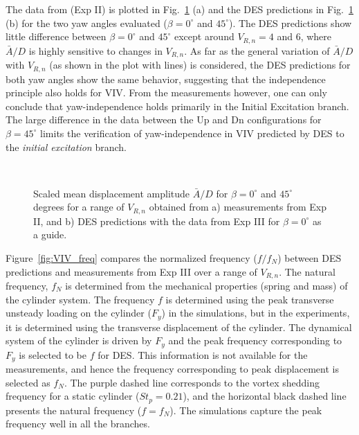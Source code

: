 The data from \citet{franzini2013one} (Exp II) is plotted in
Fig.~\ref{fig:VIV_yaw} (a) and the DES predictions in Fig.~\ref{fig:VIV_yaw}
(b) for the two yaw angles evaluated ($\beta=0^\circ$ and $45^\circ$). The DES
predictions show little difference between $\beta=0^\circ$ and $45^\circ$
except around $V_{R,n}=4$ and $6$, where $\bar{A}/D$ is highly sensitive to
changes in $V_{R,n}$. As far as the general variation of $\bar{A}/D$ with
$V_{R,n}$ (as shown in the plot with lines) is considered, the DES predictions
for both yaw angles show the same behavior, suggesting that the independence
principle also holds for VIV. From the measurements however, one can only
conclude that yaw-independence holds primarily in the Initial Excitation
branch. The large difference in the data between the Up and Dn configurations
for $\beta=45^\circ$ limits the verification of yaw-independence in VIV
predicted by DES to the {\em initial excitation} branch.
%
\begin{figure}[htb!]
  \qquad
     {} \\
  \caption{Scaled mean displacement amplitude $\bar{A}/D$ for $\beta=0^\circ$
    and $45^\circ$ degrees for a range of $V_{R,n}$ obtained from a) measurements
    from Exp II, and b) DES predictions with the data from Exp III for
    $\beta=0^\circ$ as a guide.}
  \label{fig:VIV_yaw}
\end{figure}

Figure~\ref{fig:VIV_freq} compares the normalized frequency ($f/f_N$) between
DES predictions and measurements from Exp III over a range of $V_{R,n}$. The
natural frequency, $f_N$ is determined from the mechanical properties (spring
and mass) of the cylinder system. The frequency $f$ is determined using the
peak transverse unsteady loading on the cylinder ($F_y$) in the simulations,
but in the experiments, it is determined using the transverse displacement of
the cylinder. The dynamical system of the cylinder is driven by $F_y$ and the
peak frequency corresponding to $F_y$ is selected to be $f$ for DES. This
information is not available for the measurements, and hence the frequency
corresponding to peak displacement is selected as $f_N$. The purple dashed line
corresponds to the vortex shedding frequency for a static cylinder
($St_p=0.21$), and the horizontal black dashed line presents the natural
frequency ($f=f_N$). The simulations capture the peak frequency well in all the
branches.

